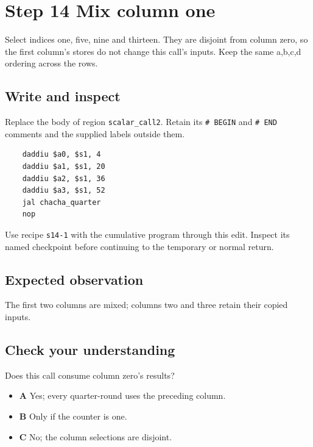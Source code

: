 \section{Step 14 Mix column one}\label{chacha-s14}

Select indices one, five, nine and thirteen. They are disjoint from column zero, so the first column's stores do not change this call's inputs. Keep the same a,b,c,d ordering across the rows.

\subsection{Write and inspect}
Replace the body of region \texttt{scalar\_call2}. Retain its \texttt{\# BEGIN} and \texttt{\# END} comments and the supplied labels outside them.

\begin{verbatim}
    daddiu $a0, $s1, 4
    daddiu $a1, $s1, 20
    daddiu $a2, $s1, 36
    daddiu $a3, $s1, 52
    jal chacha_quarter
    nop
\end{verbatim}

Use recipe \texttt{s14-1} with the cumulative program through this edit. Inspect its named checkpoint before continuing to the temporary or normal return.

\subsection{Expected observation}
The first two columns are mixed; columns two and three retain their copied inputs.

\subsection{Check your understanding}
Does this call consume column zero's results?

\begin{itemize}
  \item \textbf{A} Yes; every quarter-round uses the preceding column.
  \item \textbf{B} Only if the counter is one.
  \item \textbf{C} No; the column selections are disjoint.
\end{itemize}
